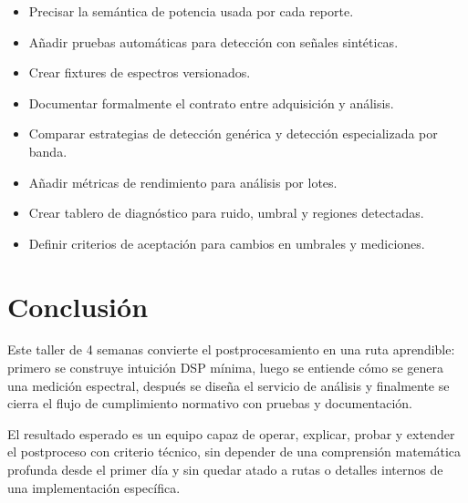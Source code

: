 \documentclass[11pt,a4paper]{article}
\begin{document}
\begin{itemize}
  \item Precisar la semántica de potencia usada por cada reporte.
  \item Añadir pruebas automáticas para detección con señales sintéticas.
  \item Crear fixtures de espectros versionados.
  \item Documentar formalmente el contrato entre adquisición y análisis.
  \item Comparar estrategias de detección genérica y detección especializada por banda.
  \item Añadir métricas de rendimiento para análisis por lotes.
  \item Crear tablero de diagnóstico para ruido, umbral y regiones detectadas.
  \item Definir criterios de aceptación para cambios en umbrales y mediciones.
\end{itemize}

\section*{Conclusión}

Este taller de 4 semanas convierte el postprocesamiento en una ruta aprendible: primero se construye intuición DSP mínima, luego se entiende cómo se genera una medición espectral, después se diseña el servicio de análisis y finalmente se cierra el flujo de cumplimiento normativo con pruebas y documentación.

El resultado esperado es un equipo capaz de operar, explicar, probar y extender el postproceso con criterio técnico, sin depender de una comprensión matemática profunda desde el primer día y sin quedar atado a rutas o detalles internos de una implementación específica.
\end{document}
